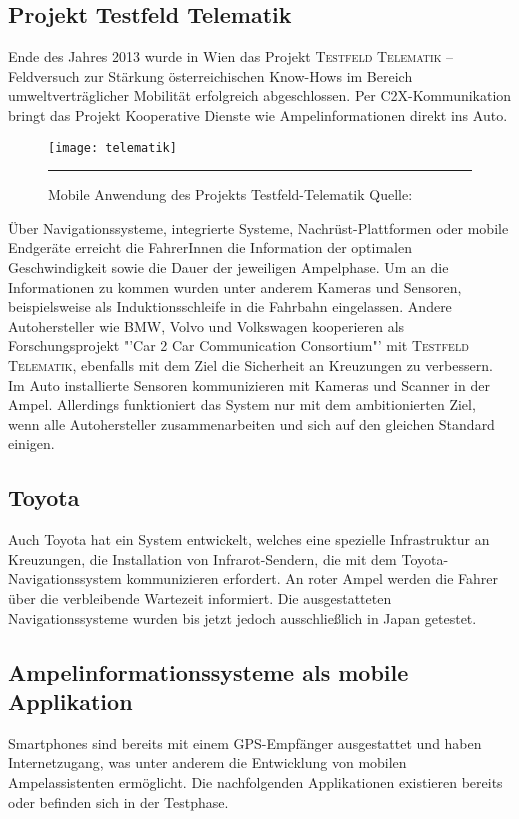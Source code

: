 \subsection*{Projekt Testfeld Telematik}
Ende des Jahres 2013 wurde in Wien das Projekt \textsc{Testfeld Telematik} -- Feldversuch zur Stärkung österreichischen Know-Hows im Bereich umweltverträglicher Mobilität erfolgreich abgeschlossen. Per \gls{C2X}-Kommunikation bringt das Projekt Kooperative Dienste wie Ampelinformationen direkt ins Auto. 
\begin{figure}[H]
    \centering
    \texttt{[image: telematik]} 
    \rule{35em}{0.5pt}
    \label{fig:telematik}
    \caption[Projekt Testfeld-Telematik Ampelinformation]{Mobile Anwendung des Projekts Testfeld-Telematik Quelle: \cite{Telematik}}
\end{figure} 
Über Navigationssysteme, integrierte Systeme, Nachrüst-Plattformen oder mobile Endgeräte erreicht die FahrerInnen die Information der optimalen Geschwindigkeit sowie die Dauer der jeweiligen Ampelphase\cite{Telematik}. Um an die Informationen zu kommen wurden unter anderem Kameras und Sensoren, beispielsweise als Induktionsschleife in die Fahrbahn eingelassen. Andere Autohersteller wie BMW, Volvo und Volkswagen kooperieren als Forschungsprojekt "'Car 2 Car Communication Consortium"' mit \textsc{Testfeld Telematik}, ebenfalls mit dem Ziel die Sicherheit an Kreuzungen zu verbessern. Im Auto installierte Sensoren kommunizieren mit Kameras und Scanner in der Ampel. Allerdings funktioniert das System nur mit dem ambitionierten Ziel, wenn alle Autohersteller zusammenarbeiten und sich auf den gleichen Standard einigen. \cite{Siemens}
\subsection*{Toyota}
Auch Toyota hat ein System entwickelt, welches eine spezielle Infrastruktur an Kreuzungen, die Installation von Infrarot-Sendern, die mit dem Toyota-Navigationssystem kommunizieren erfordert. An roter Ampel werden die Fahrer über die verbleibende Wartezeit informiert. Die ausgestatteten Navigationssysteme wurden bis jetzt jedoch ausschließlich in Japan getestet. \cite{Toyota}
%
%
\clearpage
\subsection{Ampelinformationssysteme als mobile Applikation}
\glspl{Smartphone} sind bereits mit einem \gls{GPS}-Empfänger ausgestattet und haben Internetzugang, was unter anderem die Entwicklung von mobilen Ampelassistenten ermöglicht. Die nachfolgenden Applikationen existieren bereits oder befinden sich in der Testphase.
